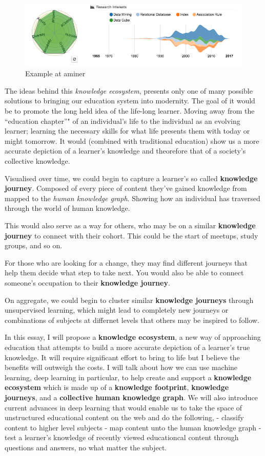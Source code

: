 \documentclass{acm_proc_article-sp}
\begin{document}
\begin{figure}
\centering
\includegraphics{img/aminer.png}
\caption{Example at aminer}
\end{figure}

The ideas behind this \emph{knowledge ecosystem}, presents only one of
many possible solutions to bringing our education system into modernity.
The goal of it would be to promote the long held idea of the life-long
learner. Moving away from the ``education chapter''" of an individual's
life to the individual as an evolving learner; learning the necessary
skills for what life presents them with today or might tomorrow. It
would (combined with traditional education) show us a more accurate
depiction of a learner's knowledge and theorefore that of a society's
collective knowledge.

Visualised over time, we could begin to capture a learner's so called
\textbf{knowledge journey}. Composed of every piece of content they've
gained knowledge from mapped to the \emph{human knowledge graph}.
Showing how an individual has traversed through the world of human
knowledge.

This would also serve as a way for others, who may be on a similar
\textbf{knowledge journey} to connect with their cohort. This could be
the start of meetups, study groups, and so on.

For those who are looking for a change, they may find different journeys
that help them decide what step to take next. You would also be able to
connect someone's occupation to their \textbf{knowledge journey}.

On aggregate, we could begin to cluster similar \textbf{knowledge
journeys} through unsupervised learning, which might lead to completely
new journeys or combinations of subjects at differnet levels that others
may be inspired to follow.

In this essay, I will propose a \textbf{knowledge ecosystem}, a new way
of approaching education that attempts to build a more accurate
depiction of a learner's true knowledge. It will require significant
effort to bring to life but I believe the benefits will outweigh the
costs. I will talk about how we can use machine learning, deep learning
in particular, to help create and support a \textbf{knowledge ecosystem}
which is made up of a \textbf{knowledge footprint}, \textbf{knowledge
journeys}, and a \textbf{collective human knowledge graph}. We will also
introduce current advances in deep learning that would enable us to take
the space of unstructured educational content on the web and do the
following, - classify content to higher level subjects - map content
unto the human knowledge graph - test a learner's knowledge of recently
viewed educationcal content through questions and answers, no what
matter the subject.
\end{document}
